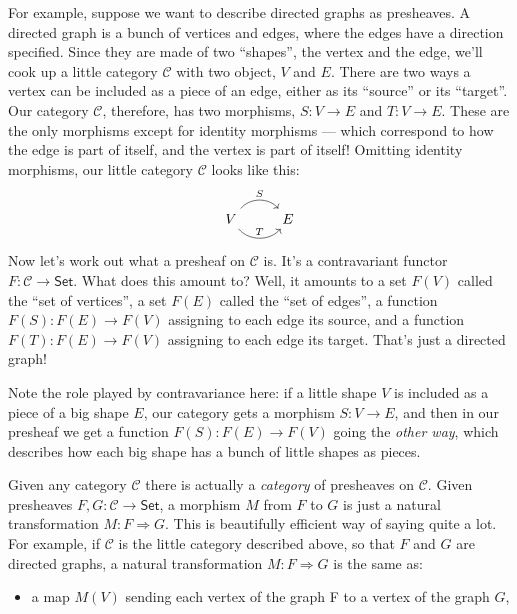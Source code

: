 \documentclass{article}
\def\tightlist{}
\begin{document}
For example, suppose we want to describe directed graphs as presheaves.
A directed graph is a bunch of vertices and edges, where the edges have
a direction specified. Since they are made of two ``shapes'', the vertex
and the edge, we'll cook up a little category \(\mathcal{C}\) with two
object, \(V\) and \(E\). There are two ways a vertex can be included as
a piece of an edge, either as its ``source'' or its ``target''. Our
category \(\mathcal{C}\), therefore, has two morphisms,
\(S\colon V\to E\) and \(T\colon V\to E\). These are the only morphisms
except for identity morphisms --- which correspond to how the edge is
part of itself, and the vertex is part of itself! Omitting identity
morphisms, our little category \(\mathcal{C}\) looks like this: \[
  \begin{tikzcd}
    V \rar[bend left=50,"S"] \rar[bend right=50,"T"] & E
  \end{tikzcd}
\] Now let's work out what a presheaf on \(\mathcal{C}\) is. It's a
contravariant functor \(F\colon\mathcal{C}\to\mathsf{Set}\). What does
this amount to? Well, it amounts to a set \(F(V)\) called the ``set of
vertices'', a set \(F(E)\) called the ``set of edges'', a function
\(F(S)\colon F(E)\to F(V)\) assigning to each edge its source, and a
function \(F(T)\colon F(E)\to F(V)\) assigning to each edge its target.
That's just a directed graph!

Note the role played by contravariance here: if a little shape \(V\) is
included as a piece of a big shape \(E\), our category gets a morphism
\(S\colon V\to E\), and then in our presheaf we get a function
\(F(S)\colon F(E)\to F(V)\) going the \emph{other way}, which describes
how each big shape has a bunch of little shapes as pieces.

Given any category \(\mathcal{C}\) there is actually a \emph{category}
of presheaves on \(\mathcal{C}\). Given presheaves
\(F,G\colon\mathcal{C}\to\mathsf{Set}\), a morphism \(M\) from \(F\) to
\(G\) is just a natural transformation \(M\colon F\Rightarrow G\). This
is beautifully efficient way of saying quite a lot. For example, if
\(\mathcal{C}\) is the little category described above, so that \(F\)
and \(G\) are directed graphs, a natural transformation
\(M\colon F\Rightarrow G\) is the same as:

\begin{itemize}
\tightlist
\item
  a map \(M(V)\) sending each vertex of the graph F to a vertex of the
  graph \(G\),
\end{itemize}
\end{document}
